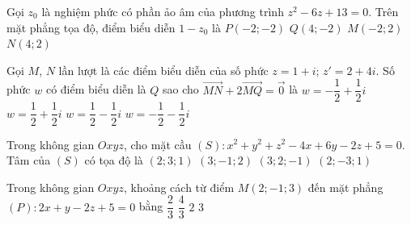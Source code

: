 \begin{ex}%
	Gọi $z_0$ là nghiệm phức có phần ảo âm của phương trình $z^2-6z+13=0$. Trên mặt phẳng tọa độ, điểm biểu diễn $1-z_0$ là
	\choice
	{$P(-2;-2)$}
	{$Q(4;-2)$}
	{\True $M(-2;2)$}
	{$N(4;2)$}	
\end{ex}

\begin{ex}%
	Gọi $M$, $N$ lần lượt là các điểm biểu diễn của số phức $z=1+i$; $z'=2+4i$. Số phức $w$ có điểm biểu diễn là $Q$ sao cho $\overrightarrow{MN}+2\overrightarrow{MQ}=\overrightarrow{0}$ là
	\choice
	{$w=-\dfrac{1}{2}+\dfrac{1}{2}i$}
	{$w=\dfrac{1}{2}+\dfrac{1}{2}i$}
	{\True $w=\dfrac{1}{2}-\dfrac{1}{2}i$}
	{$w=-\dfrac{1}{2}-\dfrac{1}{2}i$}
\end{ex}

\begin{ex}%
	Trong không gian $Oxyz$, cho mặt cầu $(S)\colon x^2+y^2+z^2-4x+6y-2z+5=0$. Tâm của $(S)$ có tọa độ là
	\choice
	{$(2;3;1)$}
	{$(3;-1;2)$}
	{$(3;2;-1)$}
	{\True $(2;-3;1)$}
\end{ex}

\begin{ex}%
	Trong không gian $Oxyz$, khoảng cách từ điểm $M(2;-1;3)$ đến mặt phẳng \break $(P)\colon 2x+y-2z+5=0$ bằng
	\choice
	{\True $\dfrac{2}{3}$}
	{$\dfrac{4}{3}$}
	{$2$}
	{$3$}
\end{ex}

